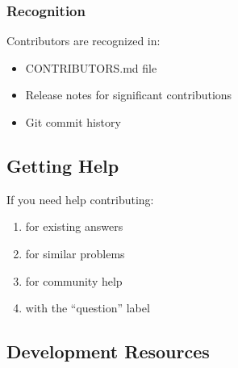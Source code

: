 \documentclass[letterpaper,10pt,english]{sphinxmanual}
\begin{document}
\subsubsection{Recognition}
\label{\detokenize{developer/contributing:recognition}}
\sphinxAtStartPar
Contributors are recognized in:
\begin{itemize}
\item {} 
\sphinxAtStartPar
CONTRIBUTORS.md file

\item {} 
\sphinxAtStartPar
Release notes for significant contributions

\item {} 
\sphinxAtStartPar
Git commit history

\end{itemize}


\subsection{Getting Help}
\label{\detokenize{developer/contributing:getting-help}}
\sphinxAtStartPar
If you need help contributing:
\begin{enumerate}
%
\item {} 
\sphinxAtStartPar
{} for existing answers

\item {} 
\sphinxAtStartPar
{} for similar problems

\item {} 
\sphinxAtStartPar
{} for community help

\item {} 
\sphinxAtStartPar
{} with the “question” label

\end{enumerate}


\subsection{Development Resources}
\label{\detokenize{developer/contributing:development-resources}}
\end{document}
